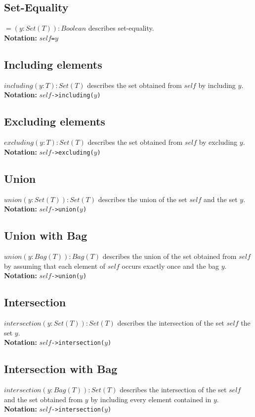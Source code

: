 \subsection{Set-Equality}
$=(y:\mathit{Set}(T)):\mathit{Boolean}$ describes set-equality.\\
  {\bf Notation:} $\mathit{self}$\verb+=+$y$
\subsection{Including elements}
$\mathit{including}(y:T):\mathit{Set}(T)$ describes the set obtained from
  $\mathit{self}$ by including $y$.\\
  {\bf Notation:} $\mathit{self}$\verb+->including(+$y$\verb+)+
\subsection{Excluding elements}
$\mathit{excluding}(y:T):\mathit{Set}(T)$ describes the set obtained from
  $\mathit{self}$ by excluding $y$.\\
  {\bf Notation:} $\mathit{self}$\verb+->excluding(+$y$\verb+)+
\subsection{Union}
$\mathit{union}(y:\mathit{Set}(T)):\mathit{Set}(T)$ describes the union of the
set
  $\mathit{self}$ and the set $y$.\\
  {\bf Notation:} $\mathit{self}$\verb+->union(+$y$\verb+)+
\subsection{Union with Bag}
$\mathit{union}(y:\mathit{Bag}(T)):\mathit{Bag}(T)$ describes the union of the
set
  obtained from $\mathit{self}$ by assuming that each element of $\mathit{self}$
  occurs exactly once and the bag $y$.\\
  {\bf Notation:} $\mathit{self}$\verb+->union(+$y$\verb+)+
\subsection{Intersection}
$\mathit{intersection}(y:\mathit{Set}(T)):\mathit{Set}(T)$ describes the
intersection
  of the set $\mathit{self}$ the set $y$.\\
  {\bf Notation:} $\mathit{self}$\verb+->intersection(+$y$\verb+)+
\subsection{Intersection with Bag}
$\mathit{intersection}(y:\mathit{Bag}(T)):\mathit{Set}(T)$ describes the
intersection
  of the set $\mathit{self}$ and the set obtained from $y$ by including every
  element contained in $y$.\\
  {\bf Notation:} $\mathit{self}$\verb+->intersection(+$y$\verb+)+
